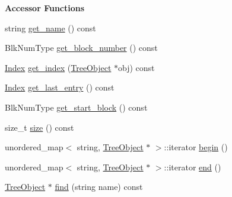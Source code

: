\begin{Indent}\textbf{ Accessor Functions}\par
\begin{DoxyCompactItemize}
\item 
string \mbox{\hyperlink{classTreeObject_a5216922ec0b98bcc375601db8d253770}{get\+\_\+name}} () const
\item 
Blk\+Num\+Type \mbox{\hyperlink{classTreeObject_af7841065fe85d0884341d72669185169}{get\+\_\+block\+\_\+number}} () const
\item 
\mbox{\hyperlink{structindex}{Index}} \mbox{\hyperlink{classTreeObject_ae0983a3ff99d413e22beaaac8d7b6d12}{get\+\_\+index}} (\mbox{\hyperlink{classTreeObject}{Tree\+Object}} $\ast$obj) const
\item 
\mbox{\hyperlink{structindex}{Index}} \mbox{\hyperlink{classTreeObject_a2d7c1a4c2d36c81110ccae09d9724125}{get\+\_\+last\+\_\+entry}} () const
\item 
Blk\+Num\+Type \mbox{\hyperlink{classTreeObject_a16153734dbee4adc99fa195715728c2f}{get\+\_\+start\+\_\+block}} () const
\item 
size\+\_\+t \mbox{\hyperlink{classTreeObject_a2a3dffe29aba8965c7977312c3721b50}{size}} () const
\item 
unordered\+\_\+map$<$ string, \mbox{\hyperlink{classTreeObject}{Tree\+Object}} $\ast$ $>$\+::iterator \mbox{\hyperlink{classTreeObject_af8bb5e54c0a13e1e0e5be409153ab6d8}{begin}} ()
\item 
unordered\+\_\+map$<$ string, \mbox{\hyperlink{classTreeObject}{Tree\+Object}} $\ast$ $>$\+::iterator \mbox{\hyperlink{classTreeObject_a2544e2976f3b75cd1f0230f5f908059c}{end}} ()
\item 
\mbox{\hyperlink{classTreeObject}{Tree\+Object}} $\ast$ \mbox{\hyperlink{classTreeObject_a6a7477c29a06a9896df549f83611252f}{find}} (string name) const
\end{DoxyCompactItemize}
\end{Indent}
